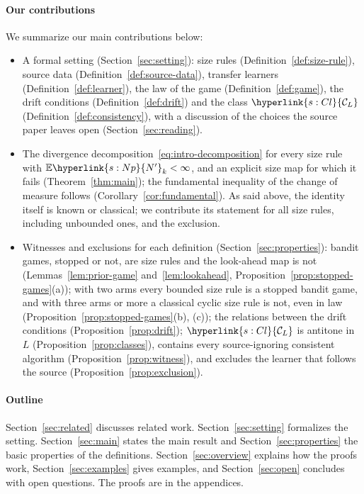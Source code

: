 \documentclass[11pt]{article}
\newcommand{\sy}[2]{\hyperlink{#1}{#2}}
\newcommand{\E}{\mathbb{E}}
\newcommand{\ClL}[1][L]{\sy{s:Cl}{\mathcal{C}_{#1}}}
\newcommand{\Np}{\sy{s:Np}{N'}}
\begin{document}
\paragraph{Our contributions} We summarize our main contributions below:
\begin{itemize}
\item A formal setting (Section~\ref{sec:setting}): size rules (Definition~\ref{def:size-rule}),
  source data (Definition~\ref{def:source-data}), transfer learners (Definition~\ref{def:learner}),
  the law of the game (Definition~\ref{def:game}), the drift conditions
  (Definition~\ref{def:drift}) and the class $\ClL$ (Definition~\ref{def:consistency}), with a
  discussion of the choices the source paper leaves open (Section~\ref{sec:reading}).
\item The divergence decomposition~\eqref{eq:intro-decomposition} for every size rule with
  $\E \Np_k<\infty$, and an explicit size map for which it fails (Theorem~\ref{thm:main}); the
  fundamental inequality of the change of measure follows (Corollary~\ref{cor:fundamental}). As
  said above, the identity itself is known or classical; we contribute its statement for all size
  rules, including unbounded ones, and the exclusion.
\item Witnesses and exclusions for each definition (Section~\ref{sec:properties}): bandit games,
  stopped or not, are size rules and the look-ahead map is not (Lemmas~\ref{lem:prior-game}
  and~\ref{lem:lookahead}, Proposition~\ref{prop:stopped-games}(a)); with two arms every bounded
  size rule is a stopped bandit game, and with three arms or more a classical cyclic size rule is
  not, even in law (Proposition~\ref{prop:stopped-games}(b), (c)); the relations between the drift
  conditions (Proposition~\ref{prop:drift}); $\ClL$ is antitone in $L$
  (Proposition~\ref{prop:classes}), contains every source-ignoring consistent algorithm
  (Proposition~\ref{prop:witness}), and excludes the learner that follows the source
  (Proposition~\ref{prop:exclusion}).
\end{itemize}

\paragraph{Outline} Section~\ref{sec:related} discusses related work. Section~\ref{sec:setting}
formalizes the setting. Section~\ref{sec:main} states the main result and
Section~\ref{sec:properties} the basic properties of the definitions. Section~\ref{sec:overview}
explains how the proofs work, Section~\ref{sec:examples} gives examples, and
Section~\ref{sec:open} concludes with open questions. The proofs are in the appendices.
\end{document}
